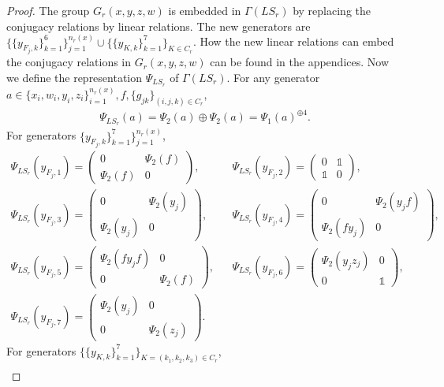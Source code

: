 \documentclass[11pt,letterpaper]{article}
\newcommand{\1}{\mathbb{1}}
\newcommand{\LS}{LS}
\theoremstyle{definition}
\begin{document}
\begin{proof}
The group $G_r(x,y,z,w)$ is embedded in $\Gamma(\LS_r)$ by replacing the conjugacy relations 
by linear relations. The new generators are $\{\{y_{F_j,k}\}_{k=1}^6\}_{j=1}^{n_r(x)}
\cup \{\{y_{K,k}\}_{k=1}^7\}_{K \in C_r}$. How the new linear relations can embed the conjugacy relations 
in $G_r(x,y,z,w)$ can be found in the appendices. Now we define the representation $\Psi_{\LS_r}$ of
$\Gamma(\LS_r)$. For any generator $a \in \{x_i, w_i, y_i, z_i\}_{i=1}^{n_r(x)}, f, \{g_{jk}\}_{(i,j,k) \in C_r}$,
\begin{align}
	\Psi_{\LS_r}(a) = \Psi_2(a) \oplus \Psi_2(a) = \Psi_1(a)^{\oplus 4}.
\end{align}
For generators $\{y_{F_j,k}\}_{k=1}^7\}_{j=1}^{n_r(x)}$,
\begin{align*}
	\Psi_{\LS_r}(y_{F_j,1}) = 
	\begin{pmatrix}
		0 & \Psi_2(f) \\
		\Psi_2(f) & 0
	\end{pmatrix},
	&&
	\Psi_{\LS_r}(y_{F_j,2}) = 
	\begin{pmatrix}
		0 & \1\\
		\1 & 0
	\end{pmatrix},\\
	\Psi_{\LS_r}(y_{F_j,3}) = 
	\begin{pmatrix}
		0 & \Psi_2(y_j) \\
		\Psi_2(y_j) & 0
	\end{pmatrix},
	&&
	\Psi_{\LS_r}(y_{F_j,4}) = 
	\begin{pmatrix}
		0 & \Psi_2(y_jf) \\
		\Psi_2(fy_j) & 0
	\end{pmatrix},\\
	\Psi_{\LS_r}(y_{F_j,5}) = 
	\begin{pmatrix}
		 \Psi_2(fy_jf) & 0\\
		  0 & \Psi_2(f)
	\end{pmatrix},
	&&
	\Psi_{\LS_r}(y_{F_j,6}) = 
	\begin{pmatrix}
		 \Psi_2(y_jz_j) & 0\\
		 0 & \1
	\end{pmatrix},\\
	\Psi_{\LS_r}(y_{F_j,7}) = 
	\begin{pmatrix}
		 \Psi_2(y_j) & 0\\
		 0 & \Psi_2(z_j)
	\end{pmatrix}.
\end{align*}
For generators $\{\{y_{K,k}\}_{k=1}^7\}_{K=(k_1,k_2,k_3) \in C_r}$,
\begin{align*}

\end{align*}
\end{proof}
\end{document}
